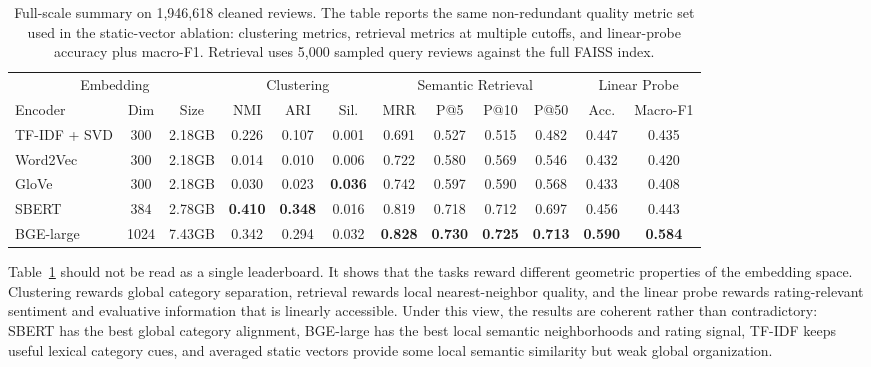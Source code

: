 \documentclass{article}
\begin{document}
\begin{table}[t]
\centering
\footnotesize
\begin{tabular*}{\textwidth}{@{\extracolsep{\fill}}lccccccccccc@{}}
\toprule
\multicolumn{3}{c}{Embedding} & \multicolumn{3}{c}{Clustering} & \multicolumn{4}{c}{Semantic Retrieval} & \multicolumn{2}{c}{Linear Probe} \\
\cmidrule(lr){1-3}\cmidrule(lr){4-6}\cmidrule(lr){7-10}\cmidrule(l){11-12}
Encoder & Dim & Size & NMI & ARI & Sil. & MRR & P@5 & P@10 & P@50 & Acc. & Macro-F1 \\
\midrule
TF-IDF + SVD & 300 & 2.18GB & 0.226 & 0.107 & 0.001 & 0.691 & 0.527 & 0.515 & 0.482 & 0.447 & 0.435 \\
Word2Vec & 300 & 2.18GB & 0.014 & 0.010 & 0.006 & 0.722 & 0.580 & 0.569 & 0.546 & 0.432 & 0.420 \\
GloVe & 300 & 2.18GB & 0.030 & 0.023 & \textbf{0.036} & 0.742 & 0.597 & 0.590 & 0.568 & 0.433 & 0.408 \\
SBERT & 384 & 2.78GB & \textbf{0.410} & \textbf{0.348} & 0.016 & 0.819 & 0.718 & 0.712 & 0.697 & 0.456 & 0.443 \\
BGE-large & 1024 & 7.43GB & 0.342 & 0.294 & 0.032 & \textbf{0.828} & \textbf{0.730} & \textbf{0.725} & \textbf{0.713} & \textbf{0.590} & \textbf{0.584} \\
\bottomrule
\end{tabular*} 
\caption{Full-scale summary on 1,946,618 cleaned reviews. The table reports the same non-redundant quality metric set used in the static-vector ablation: clustering metrics, retrieval metrics at multiple cutoffs, and linear-probe accuracy plus macro-F1. Retrieval uses 5,000 sampled query reviews against the full FAISS index.}
\label{tab:main-results}
\end{table}

Table~\ref{tab:main-results} should not be read as a single leaderboard. It shows that the tasks reward different geometric properties of the embedding space. Clustering rewards global category separation, retrieval rewards local nearest-neighbor quality, and the linear probe rewards rating-relevant sentiment and evaluative information that is linearly accessible. Under this view, the results are coherent rather than contradictory: SBERT has the best global category alignment, BGE-large has the best local semantic neighborhoods and rating signal, TF-IDF keeps useful lexical category cues, and averaged static vectors provide some local semantic similarity but weak global organization.
\end{document}
